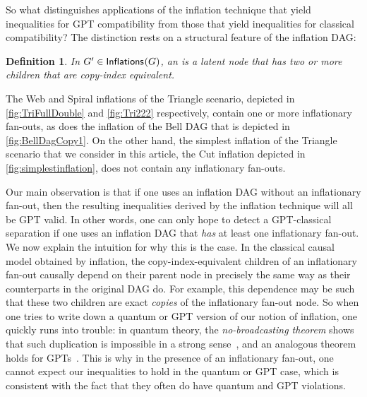 \documentclass[aps,english,superscriptaddress,onecolumn,twoside,longbibliography,pra,floatfix,fleqn,nofootinbib]{revtex4-1}%
\newcommand*{\tblue}[1]{{\color{MidnightBlue}{\textbf{#1}}}}
\newtheorem{definition}[theorem]{Definition}
\theoremstyle{definition}
\newcounter{example}[section]
\newcommand{\SmallNamedFunction}[3][]{\operatorname{\mathsf{#2}}_{#1}\parenths{#3}}
\newcommand{\inflations}[1]{\SmallNamedFunction{Inflations}{#1}}
\DeclarePairedDelimiter{\parenths}{\lparen}{\rparen}
\begin{document}
So what distinguishes applications of the inflation technique that yield inequalities for GPT compatibility from those that yield inequalities for classical compatibility?   The distinction rests on a structural feature of the inflation DAG:


\begin{definition}
In $G'\in\inflations{G}$, an \tblue{inflationary fan-out} is a latent node that has two or more children that are copy-index equivalent.  
\end{definition}

 The Web and Spiral inflations of the Triangle scenario, depicted in \cref{fig:TriFullDouble} and \cref{fig:Tri222} respectively,
contain one or more inflationary fan-outs, as does the inflation of the Bell DAG that is depicted in \cref{fig:BellDagCopy1}.  On the other hand, the simplest inflation of the Triangle scenario that we consider in this article, the Cut inflation depicted in \cref{fig:simplestinflation}, does not contain any inflationary fan-outs.

Our main observation is that if one uses an inflation DAG without an inflationary fan-out, then the resulting inequalities derived by the inflation technique will all be GPT valid. In other words, one can only hope to detect a GPT-classical separation if one uses an inflation DAG that \emph{has} at least one inflationary fan-out. We now explain the intuition for why this is the case. 
In the classical causal model obtained by inflation, the copy-index-equivalent children of an inflationary fan-out causally depend on their parent node in precisely the same way as their counterparts in the original DAG do. For example, this dependence may be such that these two children are exact \emph{copies} of the inflationary fan-out node. So when one tries to write down a quantum or GPT version of our notion of inflation, one quickly runs into trouble: in quantum theory, the {\em no-broadcasting theorem} shows that such duplication is impossible in a strong sense~\cite{NoCloningQuantum1996}, and an analogous theorem holds for GPTs~\cite{NoCloningGeneral2006}. This is why in the presence of an inflationary fan-out, one cannot expect our inequalities to hold in the quantum or GPT case, which is consistent with the fact that they often do have quantum and GPT violations.
\end{document}
